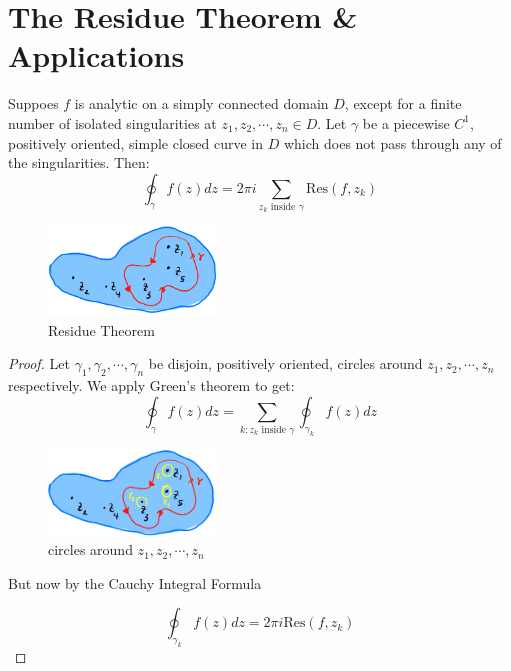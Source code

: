 \chapter{The Residue Theorem \& Applications} %

\begin{theorem}
    Suppoes $f$ is analytic on a simply connected domain $D$, except for a finite number of isolated singularities at $z_1, z_2, \cdots, z_n \in D$. Let $\gamma$ be a piecewise $C^1$, positively oriented, simple closed curve in $D$ which does not pass through any of the singularities. Then:
    \begin{equation}
        \boxed{\oint_{\gamma} f(z) dz = 2\pi i \sum_{z_k \text{ inside } \gamma} \text{Res}(f, z_k)}
    \end{equation}
\end{theorem}
\begin{figure}[H]
    \centering
    \includegraphics[width=0.4\textwidth]{LECTURE_11/residues.png}
    \caption{Residue Theorem}
    \label{fig:residue}
\end{figure}

\begin{proof}
    Let $\gamma_1, \gamma_2, \cdots, \gamma_n$ be disjoin, positively oriented, circles around $z_1, z_2, \cdots, z_n$ respectively. We apply Green's theorem to get:
    \begin{equation*}
        \oint_{\gamma} f(z) dz = \sum_{k : z_k \text{ inside } \gamma} \oint_{\gamma_k} f(z) dz
    \end{equation*}
    \begin{figure}[H]
        \centering
        \includegraphics[width=0.4\textwidth]{LECTURE_11/residues-2.png}
        \caption{circles around $z_1, z_2, \cdots, z_n$}
        \label{fig:residue-2}
    \end{figure}

    But now by the Cauchy Integral Formula

    \begin{equation*}
        \oint_{\gamma_k} f(z) dz = 2\pi i \text{Res}(f, z_k)
    \end{equation*}

\end{proof}

